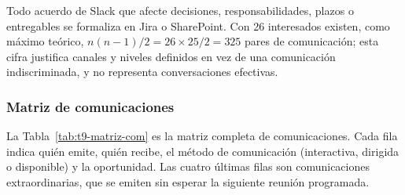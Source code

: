 \documentclass[11pt]{article}
\begin{document}
Todo acuerdo de Slack que afecte decisiones, responsabilidades, plazos o entregables se formaliza en Jira o SharePoint. Con 26 interesados existen, como máximo teórico, $n(n-1)/2 = 26 \times 25 / 2 = 325$ pares de comunicación; esta cifra justifica canales y niveles definidos en vez de una comunicación indiscriminada, y no representa conversaciones efectivas.

\subsubsection{Matriz de comunicaciones}\label{t9-5-matriz}

La Tabla~\mbox{\ref{tab:t9-matriz-com}} es la matriz completa de comunicaciones. Cada fila indica quién emite, quién recibe, el método de comunicación (interactiva, dirigida o disponible) y la oportunidad. Las cuatro últimas filas son comunicaciones extraordinarias, que se emiten sin esperar la siguiente reunión programada.
\end{document}
